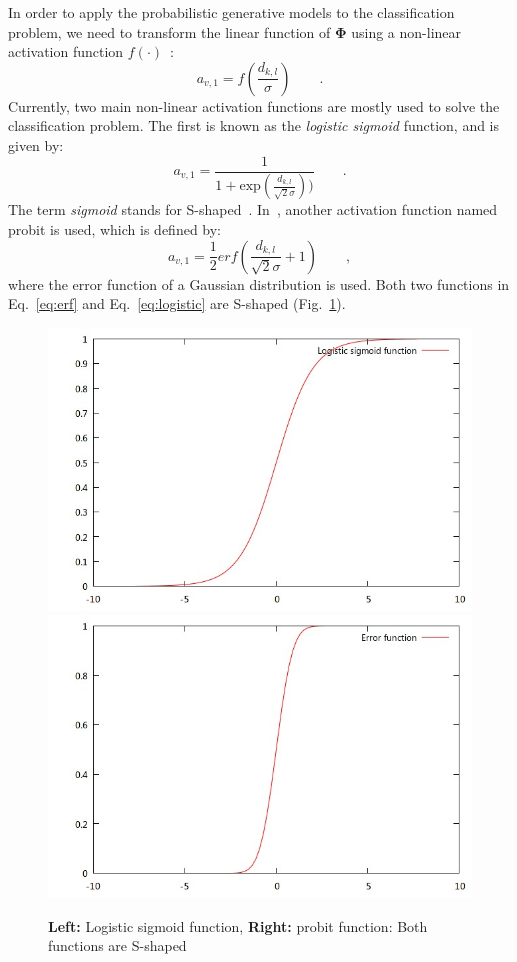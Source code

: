 \documentclass[conference]{IEEEtran}
\begin{document}
In order to apply the probabilistic generative models to the
classification problem,
we need to transform the linear function of $\mathbf{\Phi}$ using a
non-linear activation function $f(\cdot)$~\cite{bishop2006pattern}:
\begin{equation}
  \label{eq:nonla}
  a_{v,1} = f(\frac{d_{k,l}}{\sigma})\qquad.
\end{equation}
Currently, two main non-linear activation functions are mostly used
to solve the classification problem. The first is known as the
\textit{logistic sigmoid} function, and is given by:
\begin{equation}
  \label{eq:logistic}
  a_{v,1} =
  \frac{1}{1+\mathrm{exp}(\frac{d_{k,l}}{\sqrt{2}\sigma}))}\qquad .
\end{equation}
The term \textit{sigmoid} stands for
S-shaped~\cite{bishop2006pattern}. In~\cite{hanek2004contracting},
another activation function named probit is used, which is defined by:
\begin{equation}
  \label{eq:erf}
  a_{v,1} = \frac{1}{2}erf(\frac{d_{k,l}}{\sqrt{2}\sigma} + 1)\qquad ,
\end{equation}
where the error function of a Gaussian distribution is used. Both
two functions in Eq.~\ref{eq:erf} and Eq.~\ref{eq:logistic} are
S-shaped (Fig.~\ref{fig:s-shaped}).
\begin{figure} 
    \centering 
    \includegraphics[width=0.48\columnwidth]{images/logistic.jpg}
    \includegraphics[width=0.48\columnwidth]{images/erf.jpg}
    \caption{\textbf{Left:} Logistic
  sigmoid function, \textbf{Right:} probit function: Both functions
  are S-shaped}
\label{fig:s-shaped}
\end{figure}
\end{document}
